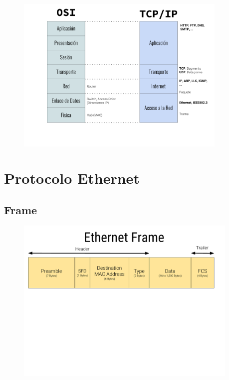 \documentclass[12pt, fleqn]{report}                             %
\theoremstyle{break}                                            %
\begin{document}
            \begin{figure}[h]
                \centering
                \includegraphics[width=0.9\textwidth]{OSI&IP}
            \end{figure}





    \clearpage
    \chapter{Protocolo Ethernet}



        \clearpage
        \section{Frame}

            \begin{figure}[h]
                \centering
                \includegraphics[width=0.95\textwidth]{Ethernet-Header}
            \end{figure}
\end{document}
